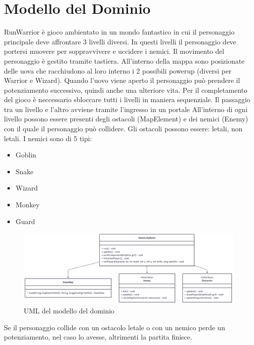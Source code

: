 \documentclass[a4paper,12pt]{report}
\begin{document}
\section{Modello del Dominio}
RunWarrior è gioco ambientato in un mondo fantastico in cui il personaggio principale deve affrontare 3 livelli diversi. In questi
livelli il personaggio deve portersi muovere per soppravvivere e uccidere i nemici. Il movimento del personaggio è gestito tramite tastiera.
All'interno della mappa sono posizionate delle uova che racchiudono al loro interno i 2 possibili powerup (diversi per Warrior e Wizard).
Quando l'uovo viene aperto il personaggio può prendere il potenziamento successivo, quindi anche una ulteriore vita.
Per il completamento del gioco è neccessario sbloccare tutti i livelli in maniera sequenziale.
Il passaggio tra un livello e l'altro avviene tramite l'ingresso in un portale 
All'interno di ogni livello possono essere presenti degli ostacoli (MapElement) e dei nemici (Enemy) con il quale il personaggio può collidere.
Gli ostacoli possono essere: letali, non letali. I nemici sono di 5 tipi:
\begin{itemize}
    \item Goblin
    \item Snake
    \item Wizard
    \item Monkey 
    \item Guard
\end{itemize}

\begin{figure}
    \centering
    \includegraphics[width=\textwidth]{resources/modelloDominioUML.png}
    \caption{UML del modello del dominio}
    \label{}
\end{figure}

Se il personaggio collide con un ostacolo letale o con un nemico perde un potenziamento, nel caso lo avesse, altrimenti la partita finisce.
\end{document}
